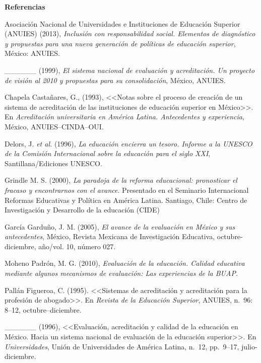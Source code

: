 \textbf{Referencias}
\enlargethispage{1\baselineskip}
 
Asociación Nacional de Universidades e Instituciones de Educación Superior
(ANUIES)  (2013), \textit{Inclusión con responsabilidad social. Elementos
de diagnóstico y propuestas para una nueva generación de políticas de
educación superior},  México: ANUIES.

\begin{sloppypar} 
\_\_\_\_\_\_ (1999), \textit{El sistema
nacional de evaluación y acreditación. Un proyecto de visión al 2010 y
propuestas para su consolidación}, México,
ANUIES.
\end{sloppypar}
 
Chapela Castañares, G., (1993), <<Notas sobre el proceso de creación de un sistema de acreditación de las instituciones de educación superior en México>>.
En \textit{Acreditación
universitaria en América Latina. Antecedentes y
experiencia}, México, ANUIES--CINDA--OUI. 

 
Delors, J. \textit{et al.} (1996), \textit{La educación encierra un tesoro.
Informe a la UNESCO de la Comisión Internacional sobre la educación para el
siglo XXI}, Santillana\slash{}Ediciones UNESCO.

 
Grindle M. S. (2000), \textit{La paradoja de la reforma educacional:
pronosticar el fracaso y encontrarnos con el avance}. Presentado en el
Seminario Internacional Reformas  Educativas y Política en América Latina.
Santiago, Chile: Centro de Investigación y Desarrollo de la educación
(CIDE)

 
García Garduño, J. M. (2005), \textit{El avance de la evaluación en México
y sus antecedentes}, México, Revista Mexicana de Investigación Educativa,
octubre-diciembre, año\slash{}vol. 10, número 027.

 
Moheno Padrón, M. G. (2010), \textit{Evaluación de la educación. Calidad
educativa mediante algunos mecanismos de evaluación: Las experiencias de la
BUAP}.

 
Pallán Figueroa, C. (1995). <<Sistemas de
acreditación y acreditación para la profesión de abogado>>.
En \textit{Revista de la Educación Superior},
ANUIES, n.\ 96: 8--12, octubre--diciembre.

 
\_\_\_\_\_\_ (1996), <<Evaluación, acreditación
y calidad de la educación en México. Hacia un sistema nacional de
evaluación de la educación superior>>. En
\textit{Universidades},  Unión de Universidades
de América Latina, n.\ 12, pp.\ 9--17, julio-diciembre.
\enlargethispage{2\baselineskip}
 
